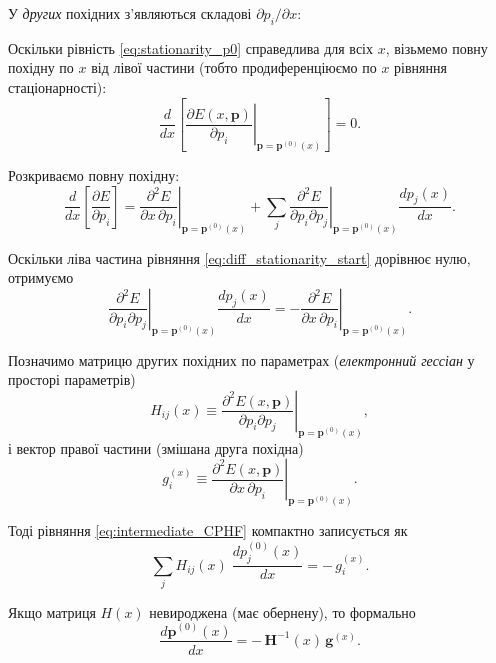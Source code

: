 \documentclass{PySCFBook}
\begin{document}
У \emph{других} похідних з'являються складові $\partial p_i/\partial x$:

Оскільки рівність \eqref{eq:stationarity_p0} справедлива для всіх \(x\),
візьмемо повну похідну по \(x\) від лівої частини (тобто продиференціюємо по \(x\) рівняння стаціонарності):
\begin{equation}
\frac{d}{dx}\left[
\left.\frac{\partial E(x,\mathbf p)}{\partial p_i}\right|_{\mathbf p=\mathbf p^{(0)}(x)}
\right] = 0.
\label{eq:diff_stationarity_start}
\end{equation}

Розкриваємо повну похідну:
\begin{equation}
\frac{d}{dx}\left[\frac{\partial E}{\partial p_i}\right]
=
\left.\frac{\partial^2 E}{\partial x\,\partial p_i}\right|_{\mathbf p=\mathbf p^{(0)}(x)}
+
\sum_j
\left.\frac{\partial^2 E}{\partial p_i \partial p_j}\right|_{\mathbf p=\mathbf p^{(0)}(x)}
\frac{d p_j(x)}{dx}.
\label{eq:diff_stationarity_explicit}
\end{equation}

Оскільки ліва частина рівняння \eqref{eq:diff_stationarity_start} дорівнює нулю,
отримуємо
\begin{equation}
\left.\frac{\partial^2 E}{\partial p_i \partial p_j}\right|_{\mathbf p=\mathbf p^{(0)}(x)}
\frac{d p_j(x)}{dx}
= -
\left.\frac{\partial^2 E}{\partial x\,\partial p_i}\right|_{\mathbf p=\mathbf p^{(0)}(x)}.
\label{eq:intermediate_CPHF}
\end{equation}

Позначимо матрицю других похідних по параметрах (\emph{електронний гессіан} у просторі параметрів)
\begin{equation}
H_{ij}(x) \equiv
\left.\frac{\partial^2 E(x,\mathbf p)}{\partial p_i \partial p_j}\right|_{\mathbf p=\mathbf p^{(0)}(x)},
\label{eq:H_matrix_def}
\end{equation}
і вектор правої частини (змішана друга похідна)
\begin{equation}
g_i^{(x)} \equiv
\left.\frac{\partial^2 E(x,\mathbf p)}{\partial x\,\partial p_i}\right|_{\mathbf p=\mathbf p^{(0)}(x)}.
\label{eq:g_vector_def}
\end{equation}

Тоді рівняння \eqref{eq:intermediate_CPHF} компактно записується як
\begin{equation}
\sum_j H_{ij}(x)\;\frac{d p_j^{(0)}(x)}{dx} = -\,g_i^{(x)}.
\label{eq:CPHF_derived_compact}
\end{equation}

Якщо матриця \(H(x)\) невироджена (має обернену), то формально
\begin{equation}
\frac{d\mathbf p^{(0)}(x)}{dx} = -\,\mathbf{H}^{-1}(x)\,\mathbf g^{(x)}.
\label{eq:dpdx_solution}
\end{equation}
\end{document}
